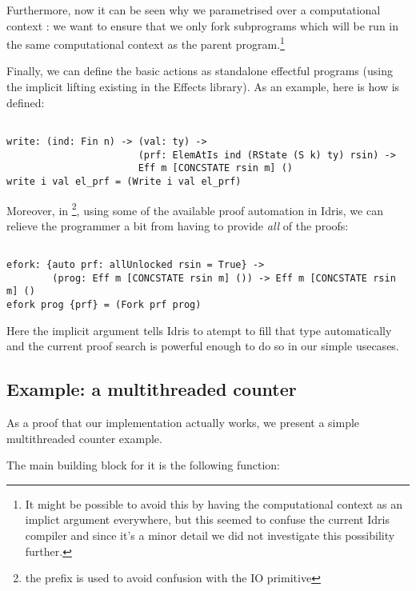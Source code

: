 Furthermore, now it can be seen why we parametrised  over
a computational context : we want to ensure that we only
fork  subprograms which will be run in the same computational
context as the parent  program.\footnote{It might be possible to avoid
this by having the computational context as an implict argument everywhere, but
this seemed to confuse the current Idris compiler and since it's a minor detail
we did not investigate this possibility further.}

Finally, we can define the basic actions as standalone effectful programs
(using the implicit lifting existing in the Effects library).
As an example, here is how  is defined:

\begin{BVerbatim}

write: (ind: Fin n) -> (val: ty) ->
                       (prf: ElemAtIs ind (RState (S k) ty) rsin) ->
                       Eff m [CONCSTATE rsin m] ()
write i val el_prf = (Write i val el_prf)

\end{BVerbatim}

Moreover, in \footnote{the  prefix is used to avoid
confusion with the IO primitive }, using some of the available proof
automation in Idris, we can relieve the programmer a bit from having to provide
\emph{all} of the proofs:

\begin{BVerbatim}

efork: {auto prf: allUnlocked rsin = True} ->
        (prog: Eff m [CONCSTATE rsin m] ()) -> Eff m [CONCSTATE rsin m] ()
efork prog {prf} = (Fork prf prog)

\end{BVerbatim}

Here the implicit argument  tells Idris to atempt to
fill that type automatically and the current proof search is powerful enough to
do so in our simple usecases.

\subsection{Example: a multithreaded counter}

As a proof that our implementation actually works, we present a simple
multithreaded counter example.

The main building block for it is the following function:

